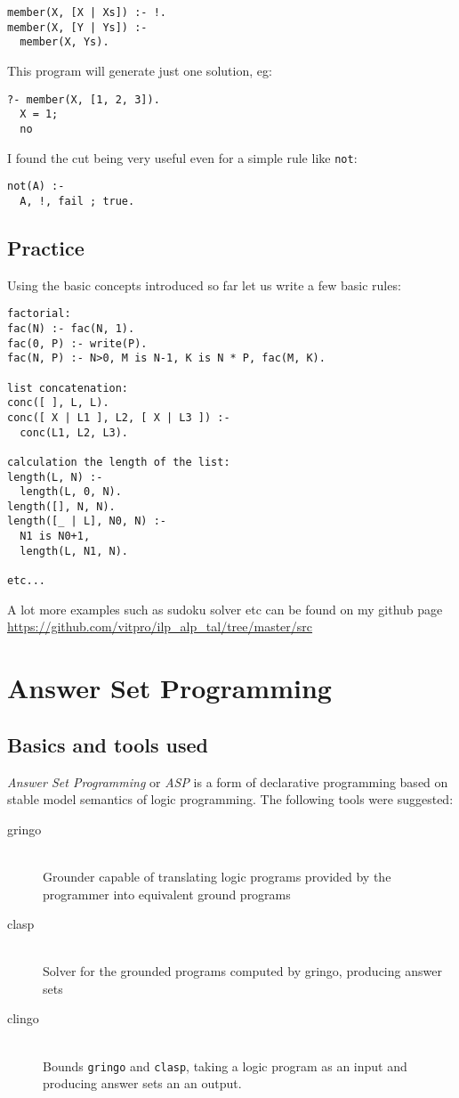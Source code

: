 \documentclass[11pt]{article}
\begin{document}
\begin{lstlisting}
member(X, [X | Xs]) :- !.
member(X, [Y | Ys]) :-
  member(X, Ys).
\end{lstlisting}
This program will generate just one solution, eg:
\begin{lstlisting}
?- member(X, [1, 2, 3]).
  X = 1;
  no
\end{lstlisting}
I found the cut being very useful even for a simple rule like \texttt{not}:
\begin{lstlisting}
not(A) :-
  A, !, fail ; true.
\end{lstlisting}


\subsection{Practice}
Using the basic concepts introduced so far let us write a few basic rules:
\begin{lstlisting}
factorial:
fac(N) :- fac(N, 1).
fac(0, P) :- write(P).
fac(N, P) :- N>0, M is N-1, K is N * P, fac(M, K).

list concatenation:
conc([ ], L, L).
conc([ X | L1 ], L2, [ X | L3 ]) :- 
  conc(L1, L2, L3).

calculation the length of the list:
length(L, N) :-
  length(L, 0, N).
length([], N, N).
length([_ | L], N0, N) :-
  N1 is N0+1,
  length(L, N1, N).

etc...
\end{lstlisting}
A lot more examples such as sudoku solver etc can be found on my github page \url{https://github.com/vitpro/ilp_alp_tal/tree/master/src}


\section{Answer Set Programming}

\subsection{Basics and tools used}
\emph{Answer Set Programming} or \emph{ASP} is a form of declarative programming based on stable model semantics of logic programming.  
The following tools were suggested:

\begin{description}
  \item[gringo] \hfill \\
  Grounder capable of translating logic programs provided by the programmer into equivalent ground programs
  \item[clasp] \hfill \\
  Solver for the grounded programs computed by gringo, producing answer sets
  \item[clingo] \hfill \\
  Bounds \texttt{gringo} and \texttt{clasp}, taking a logic program as an input and producing answer sets an an output. 
\end{description}
\end{document}
